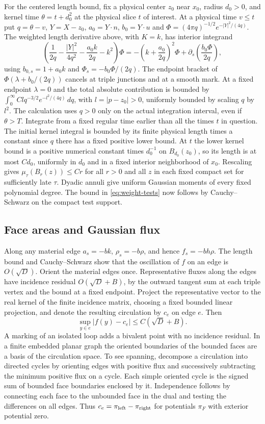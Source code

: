 For the centered length bound, fix a physical center \(z_0\) near \(x_0\), radius \(d_0>0\), and kernel time \(\theta=t+d_0^2\) at the physical slice \(t\) of interest. At a physical time \(v\le t\) put \(q=\theta-v\), \(Y=X-z_0\), \(a_0=Y\cdot n\), \(b_0=Y\cdot u\) and \(\Phi=(4\pi q)^{-1/2}e^{-|Y|^2/(4q)}\). The weighted length derivative above, with \(K=k\), has interior integrand \[
\left(\frac1{2q}-\frac{|Y|^2}{4q^2}-\frac{a_0k}{2q}-k^2\right)\Phi
=-\left(k+\frac{a_0}{2q}\right)^2\Phi
+\partial_s\!\left(\frac{b_0\Phi}{2q}\right),
\] using \(b_{0,s}=1+a_0k\) and \(\Phi_s=-b_0\Phi/(2q)\). The endpoint bracket of \(\Phi(\lambda+b_0/(2q))\) cancels at triple junctions and at a smooth mark. At a fixed endpoint \(\lambda=0\) and the total absolute contribution is bounded by \(\int_0^\infty C l q^{-3/2}e^{-l^2/(4q)}\,dq\), with \(l=|p-z_0|>0\), uniformly bounded by scaling \(q\) by \(l^2\). The calculation uses \(q>0\) only on the actual integration interval, even if \(\theta>T\). Integrate from a fixed regular time earlier than all the times \(t\) in question. The initial kernel integral is bounded by its finite physical length times a constant since \(q\) there has a fixed positive lower bound. At \(t\) the lower kernel bound is a positive numerical constant times \(d_0^{-1}\) on \(B_{d_0}(z_0)\), so its length is at most \(C d_0\), uniformly in \(d_0\) and in a fixed interior neighborhood of \(x_0\). Rescaling gives \(\mu_\tau(B_r(z))\le Cr\) for all \(r>0\) and all \(z\) in each fixed compact set for sufficiently late \(\tau\). Dyadic annuli give uniform Gaussian moments of every fixed polynomial degree. The bound in \eqref{eq:weight-tests} now follows by Cauchy--Schwarz on the compact test support.

\subsection{Face areas and Gaussian flux}\label{sec:faces}

Along any material edge \(a_s=-bk\), \(\rho_s=-b\rho\), and hence \(f_s=-b h\rho\). The length bound and Cauchy--Schwarz show that the oscillation of \(f\) on an edge is \(O(\sqrt D)\). Orient the material edges once. Representative fluxes along the edges have incidence residual \(O(\sqrt D+B)\), by the outward tangent sum at each triple vertex and the bound at a fixed endpoint. Project the representative vector to the real kernel of the finite incidence matrix, choosing a fixed bounded linear projection, and denote the resulting circulation by \(c_e\) on edge \(e\). Then \[
 \sup_{y\in e}|f(y)-c_e|\le C(\sqrt D+B).
\] A marking of an isolated loop adds a bivalent point with no incidence residual. In a finite embedded planar graph the oriented boundaries of the bounded faces are a basis of the circulation space. To see spanning, decompose a circulation into directed cycles by orienting edges with positive flux and successively subtracting the minimum positive flux on a cycle. Each simple oriented cycle is the signed sum of bounded face boundaries enclosed by it. Independence follows by connecting each face to the unbounded face in the dual and testing the differences on all edges. Thus \(c_e=\pi_{\rm left}-\pi_{\rm right}\) for potentials \(\pi_F\) with exterior potential zero.

